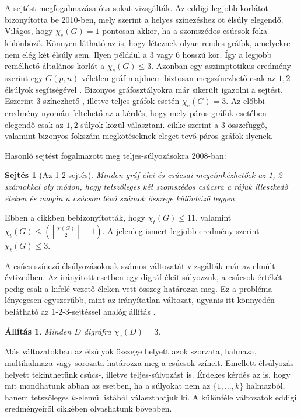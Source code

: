 \documentclass[12pt, a4paper]{report}
\newtheorem{áll}[tét]{Állítás}
\newtheorem{sej}[tét]{Sejtés}
\theoremstyle{remark}
\theoremstyle{definition}
\begin{document}
A sejtést megfogalmazása óta sokat vizsgálták. Az eddigi legjobb korlátot \citeauthor{Kalkowski2010} \cite{Kalkowski2010} bizonyította be 2010-ben, mely szerint a helyes színezéshez öt élsúly elegendő. Világos, hogy $\chi_e(G) = 1$ pontosan akkor, ha a szomszédos csúcsok foka különböző. Könnyen látható az is, hogy léteznek olyan rendes gráfok, amelyekre nem elég két élsúly sem. Ilyen például a $3$ vagy $6$ hosszú kör. Így a legjobb remélhető általános korlát a $\chi_e(G) \leq 3$. Azonban egy aszimptotikus eredmény szerint egy $G(p, n)$ véletlen gráf majdnem biztosan megszínezhető csak az $1, 2$ élsúlyok segítségével \cite{AddarioBerry2008}. Bizonyos gráfosztályokra már sikerült igazolni a sejtést. Eszerint $3$-színezhető \cite{Karonski2004}, illetve teljes gráfok \cite{Alaeiyan2012} esetén $\chi_e(G) = 3$. Az előbbi eredmény nyomán feltehető az a kérdés, hogy mely páros gráfok esetében elegendő csak az $1, 2$ súlyok közül választani. \citeauthor{Lu2011} \cite{Lu2011} cikke szerint a $3$-összefüggő, valamint bizonyos fokszám-megkötéseknek eleget tevő páros gráfok ilyenek.

Hasonló sejtést fogalmazott meg teljes-súlyozásokra \citeauthor{Przybylo2010} 2008-ban:

\begin{sej}[Az 1-2-sejtés]
Minden gráf élei és csúcsai megcímkézhetőek az 1, 2 számokkal oly módon, hogy tetszőleges két szomszédos csúcsra a rájuk illeszkedő éleken és magán a csúcson lévő számok összege különböző legyen.
\end{sej}

Ebben a cikkben bebizonyították, hogy $\chi_t(G) \leq 11$, valamint $\chi_t(G) \leq \left( \left\lfloor \frac{χ(G)}{2} \right\rfloor + 1 \right)$. A jelenleg ismert legjobb eredmény szerint $\chi_t(G) \leq 3$.

A csúcs-színező élsúlyozásoknak számos változatát vizsgálták már az elmúlt évtizedben. Az irányított esetben egy digráf éleit súlyozzuk, a csúcsok értékét pedig csak a kifelé vezető éleken vett összeg határozza meg. Ez a probléma lényegesen egyszerűbb, mint az irányítatlan változat, ugyanis itt könnyedén belátható az 1-2-3-sejtéssel analóg állítás \cite{Baudon2014}.

\begin{áll}
Minden $D$ digráfra $\chi_e(D) = 3$.
\end{áll}

Más változatokban az élsúlyok összege helyett azok szorzata, halmaza, multihalmaza vagy sorozata határozza meg a csúcsok színeit. Emellett élsúlyozás helyett tekinthetünk csúcs-, illetve teljes-súlyozást is. Érdekes kérdés az is, hogy mit mondhatunk abban az esetben, ha a súlyokat nem az $\lbrace 1, \ldots, k \rbrace$ halmazból, hanem tetszőleges $k$-elemű listából választhatjuk ki. A különféle változatok eddigi eredményeiről \citeauthor{Seamone2012} \cite{Seamone2012} cikkében olvashatunk bővebben.
\end{document}
